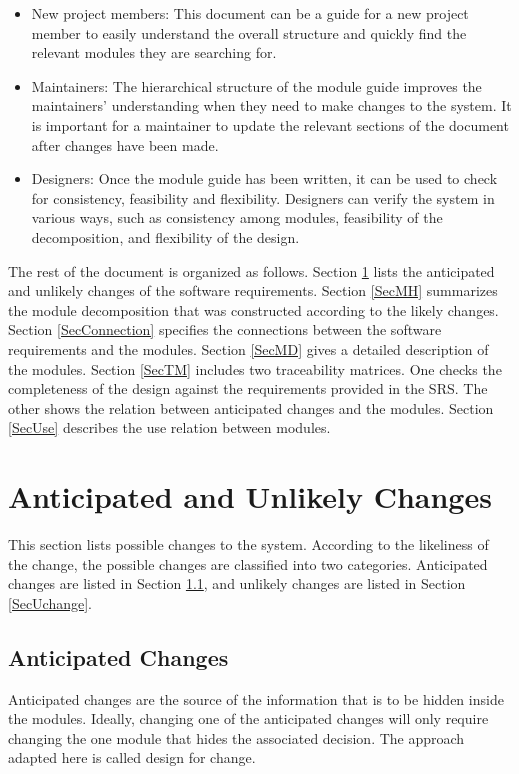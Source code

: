 \documentclass[12pt]{article}
\begin{document}
\begin{itemize}
\item New project members: This document can be a guide for a new project member
  to easily understand the overall structure and quickly find the
  relevant modules they are searching for.
\item Maintainers: The hierarchical structure of the module guide improves the
  maintainers' understanding when they need to make changes to the system. It is
  important for a maintainer to update the relevant sections of the document
  after changes have been made.
\item Designers: Once the module guide has been written, it can be used to
  check for consistency, feasibility and flexibility. Designers can verify the
  system in various ways, such as consistency among modules, feasibility of the
  decomposition, and flexibility of the design.
\end{itemize}

The rest of the document is organized as follows. Section
\ref{SecChange} lists the anticipated and unlikely changes of the software
requirements. Section \ref{SecMH} summarizes the module decomposition that
was constructed according to the likely changes. Section \ref{SecConnection}
specifies the connections between the software requirements and the
modules. Section \ref{SecMD} gives a detailed description of the
modules. Section \ref{SecTM} includes two traceability matrices. One checks
the completeness of the design against the requirements provided in the SRS. The
other shows the relation between anticipated changes and the modules. Section
\ref{SecUse} describes the use relation between modules.

\section{Anticipated and Unlikely Changes} \label{SecChange}

This section lists possible changes to the system. According to the likeliness
of the change, the possible changes are classified into two
categories. Anticipated changes are listed in Section \ref{SecAchange}, and
unlikely changes are listed in Section \ref{SecUchange}.

\subsection{Anticipated Changes} \label{SecAchange}

Anticipated changes are the source of the information that is to be hidden
inside the modules. Ideally, changing one of the anticipated changes will only
require changing the one module that hides the associated decision. The approach
adapted here is called design for
change. %
\end{document}
